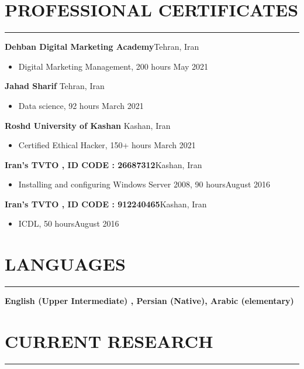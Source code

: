 \documentclass[12pt]{res} %
\begin{document}
\begin{resume}
\section{\bf PROFESSIONAL CERTIFICATES}
\vspace{-8pt}
\noindent\rule{\textwidth}{0.5mm}
\vspace{1pt}

{\bf Dehban Digital Marketing Academy}\hfill Tehran, Iran
\begin{itemize}
\item Digital Marketing Management, 200 hours \hfill May 2021
\end{itemize}

{\bf Jahad Sharif } \hfill Tehran, Iran
\begin{itemize}
\item Data science, 92 hours
\hfill March 2021
\end{itemize}
{\bf Roshd University of Kashan } \hfill Kashan, Iran
\begin{itemize}
\item Certified Ethical Hacker, 150+ hours
\hfill March 2021
\end{itemize}
{\bf Iran's TVTO , ID CODE : 26687312}\hfill Kashan, Iran
\begin{itemize}
\item Installing and configuring Windows Server 2008, 90 hours\hfill August 2016
\end{itemize}
\vspace{30pt}
{\bf Iran's TVTO , ID CODE : 912240465}\hfill Kashan, Iran
\begin{itemize}
\item ICDL, 50 hours\hfill August 2016
\end{itemize}
\vspace{15pt}
\section{\bf LANGUAGES}
\vspace{-8pt}
\noindent\rule{\textwidth}{0.5mm}
{\bf English (Upper Intermediate) , Persian (Native), Arabic (elementary)}
\\
\section{\bf CURRENT RESEARCH}
\vspace{-8pt}
\noindent\rule{\textwidth}{0.5mm}
\vspace{1pt}


\end{resume}
\end{document}

